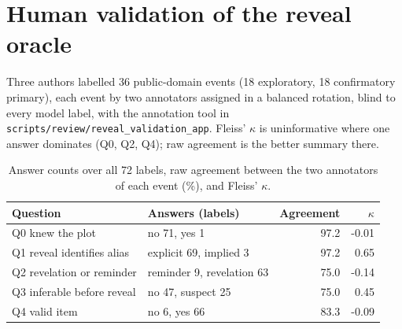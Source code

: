 \documentclass[11pt]{article}
\begin{document}
\section{Human validation of the reveal oracle}
Three authors labelled 36 public-domain events (18 exploratory, 18 confirmatory primary), each event by two annotators assigned in a balanced rotation, blind to every model label, with the annotation tool in \texttt{scripts/review/reveal\_validation\_app}. Fleiss' $\kappa$ is uninformative where one answer dominates (Q0, Q2, Q4); raw agreement is the better summary there.

\begin{table}[!ht]
\centering
\scriptsize
\caption{Answer counts over all 72 labels, raw agreement between the two annotators of each event (\%), and Fleiss' $\kappa$.}\label{tab:s-human}
\begin{tabular}{lp{6.2cm}rr}
\toprule
Question & Answers (labels) & Agreement & $\kappa$ \\
\midrule
Q0 knew the plot & no 71, yes 1 & 97.2 & -0.01 \\
Q1 reveal identifies alias & explicit 69, implied 3 & 97.2 & 0.65 \\
Q2 revelation or reminder & reminder 9, revelation 63 & 75.0 & -0.14 \\
Q3 inferable before reveal & no 47, suspect 25 & 75.0 & 0.45 \\
Q4 valid item & no 6, yes 66 & 83.3 & -0.09 \\
\bottomrule
\end{tabular}
\end{table}
\end{document}

